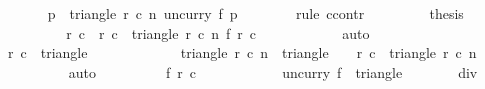 \begin{isabellebody}
\ \ \ \ \isamarkupfalse%
\ {\isachardoublequoteopen}{\isasymforall}\ p\ {\isasymin}\ triangle\ r{}\ c{}\ n{\isachardot}\ {\isacharparenleft}uncurry\ f{\isacharparenright}\ p\ {\isachargreater}\ {}{}{}{}{\isachardoublequoteclose}\isanewline
\ \ \ \ \isamarkupfalse%
\ {\isacharparenleft}rule\ ccontr{\isacharparenright}\isanewline
\ \ \ \ \ \ \isamarkupfalse%
\ {\isachardoublequoteopen}{\isasymnot}\ {\isacharquery}thesis{\isachardoublequoteclose}\isanewline
\ \ \ \ \ \ \isamarkupfalse%
\ \isamarkupfalse%
\ r\ c\ \ {\isachardoublequoteopen}{\isacharparenleft}r{\isacharcomma}\ c{\isacharparenright}\ {\isasymin}\ triangle\ r{}\ c{}\ n{\isachardoublequoteclose}\ {\isachardoublequoteopen}f\ r\ c\ {\isasymle}\ {}{}{}{}{\isachardoublequoteclose}\isanewline
\ \ \ \ \ \ \ \ \isamarkupfalse%
\ auto\isanewline
\ \ \ \ \ \ \isamarkupfalse%
\isanewline
\ \ \ \ \ \ \isamarkupfalse%
\ {\isachardoublequoteopen}{\isacharparenleft}r{\isacharcomma}\ c{\isacharparenright}\ {\isasymin}\ triangle\ {}\ {}\ {}{}{}{}{\isachardoublequoteclose}\isanewline
\ \ \ \ \ \ \ \ \isamarkupfalse%
\ {\isacharbackquoteopen}triangle\ r{}\ c{}\ n\ {\isasymsubseteq}\ triangle\ {}\ {}\ {}{}{}{}{\isacharbackquoteclose}\ {\isacharbackquoteopen}{\isacharparenleft}r{\isacharcomma}\ c{\isacharparenright}\ {\isasymin}\ triangle\ r{}\ c{}\ n{\isacharbackquoteclose}\isanewline
\ \ \ \ \ \ \ \ \isamarkupfalse%
\ auto\isanewline
\ \ \ \ \ \ \isamarkupfalse%
\ \isamarkupfalse%
\ {\isachardoublequoteopen}f\ r\ c\ {\isasymge}\ {}{\isachardoublequoteclose}\isanewline
\ \ \ \ \ \ \ \ \isamarkupfalse%
\ {\isacartoucheopen}{\isacharparenleft}uncurry\ f{\isacharparenright}\ {\isacharbackquote}\ {\isacharparenleft}triangle\ {}\ {}\ {}{}{}{}{\isacharparenright}\ {\isacharequal}\ {\isacharbraceleft}{}{\isachardot}{\isachardot}{\isacharless}{}{}{}{}{\isacharasterisk}{\isacharparenleft}{}{}{}{}\ {\isacharplus}\ {}{\isacharparenright}\ div\ {}\ {\isacharplus}\ {}{\isacharbraceright}{\isacartoucheclose}\isanewline

\end{isabellebody}
